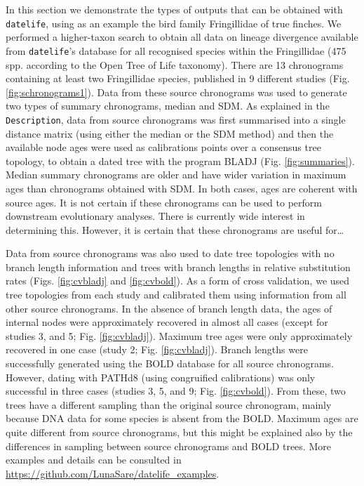 \documentclass[]{article}
\begin{document}
In this section we demonstrate the types of outputs that can be obtained with \texttt{datelife}, using as an example the bird family Fringillidae of true finches. We performed a higher-taxon search to obtain all data on lineage divergence available from \texttt{datelife}'s database for all recognised species within the Fringillidae (475 spp. according to the Open Tree of Life taxonomy). There are 13 chronograms containing at least two Fringillidae species, published in 9 different studies (Fig. \ref{fig:schronograms1}).
Data from these source chronograms was used to generate two types of summary chronograms, median and SDM. As explained in the \texttt{Description}, data from source chronograms was first summarised into a single distance matrix (using either the median or the SDM method) and then the available node ages were used as calibrations points over a consensus tree topology, to obtain a dated tree with the program BLADJ (Fig. \ref{fig:summaries}). Median summary chronograms are older and have wider variation in maximum ages than chronograms obtained with SDM. In both cases, ages are coherent with source ages.
It is not certain if these chronograms can be used to perform downstream evolutionary analyses. There is currently wide interest in determining this. However, it is certain that these chronograms are useful for\ldots{}

Data from source chronograms was also used to date tree topologies with no branch length information and trees with branch lengths in relative substitution rates (Figs. \ref{fig:cvbladj} and \ref{fig:cvbold}). As a form of cross validation, we used tree topologies from each study and calibrated them using information from all other source chronograms. In the absence of branch length data, the ages of internal nodes were approximately recovered in almost all cases (except for studies 3, and 5; Fig. \ref{fig:cvbladj}). Maximum tree ages were only approximately recovered in one case (study 2; Fig. \ref{fig:cvbladj}).
Branch lengths were successfully generated using the BOLD database for all source chronograms. However, dating with PATHd8 (using congruified calibrations) was only successful in
three cases (studies 3, 5, and 9; Fig. \ref{fig:cvbold}). From these, two trees have a different sampling than the original source chronogram, mainly because DNA data for some species is absent from the BOLD. Maximum ages are quite different from source chronograms, but this might be explained also by the differences in sampling between source chronograms and BOLD trees.
More examples and details can be consulted in \url{https://github.com/LunaSare/datelife_examples}.
\end{document}
